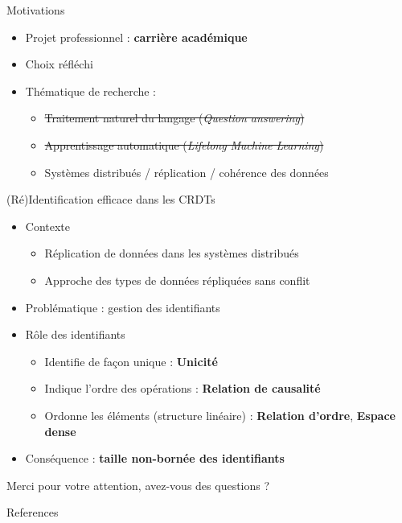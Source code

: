 \documentclass[10pt]{beamer}
\begin{document}

\begin{frame}{Motivations}
  \begin{itemize}
    \item Projet professionnel : \textbf{carrière académique}
    \item Choix réfléchi
    \item Thématique de recherche :
      \begin{itemize}
        \item \st{Traitement naturel du langage (\emph{Question answering})}
        \item \st{Apprentissage automatique (\emph{Lifelong Machine Learning})}
        \item Systèmes distribués / réplication / cohérence des données
      \end{itemize}
  \end{itemize}
\end{frame}

\begin{frame}{(Ré)Identification efficace dans les CRDTs}
  \begin{itemize}
    \item Contexte
    \begin{itemize}
      \item Réplication de données dans les systèmes distribués
      \item Approche des types de données répliquées sans conflit \cite{ShapiroSSS2011}
    \end{itemize}

    \item Problématique : gestion des identifiants

    \item Rôle des identifiants
    \begin{itemize}
      \item Identifie de façon unique : \textbf{Unicité}
      \item Indique l'ordre des opérations : \textbf{Relation de causalité}
      \item Ordonne les éléments (structure linéaire) : \textbf{Relation d'ordre}, \textbf{Espace dense}
    \end{itemize}

    \item Conséquence : \textbf{taille non-bornée des identifiants}
  \end{itemize}
\end{frame}

\begin{frame}[standout]
  Merci pour votre attention, avez-vous des questions ?
\end{frame}

\begin{frame}[allowframebreaks]{References}
	
	
\end{frame}
\end{document}

